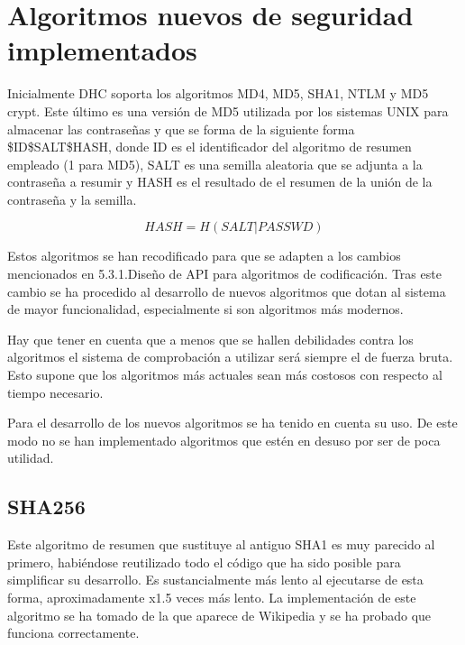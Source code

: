 \section{Algoritmos nuevos de seguridad implementados}

Inicialmente DHC soporta los algoritmos MD4, MD5, SHA1, NTLM y MD5 crypt. Este último es una versión de MD5 utilizada por los sistemas UNIX para almacenar las contraseñas y que se forma de la siguiente forma \$ID\$SALT\$HASH, donde ID es el identificador del algoritmo de resumen empleado (1 para MD5), SALT es una semilla aleatoria que se adjunta a la contraseña a resumir y HASH es el resultado de el resumen de la unión de la contraseña y la semilla.

$$HASH = H(SALT | PASSWD)$$

Estos algoritmos se han recodificado para que se adapten a los cambios mencionados en 5.3.1.Diseño de API para algoritmos de codificación. Tras este cambio se ha procedido al desarrollo de nuevos algoritmos que dotan al sistema de mayor funcionalidad, especialmente si son algoritmos más modernos.

Hay que tener en cuenta que a menos que se hallen debilidades contra los algoritmos el sistema de comprobación a utilizar será siempre el de fuerza bruta. Esto supone que los algoritmos más actuales sean más costosos con respecto al tiempo necesario.

Para el desarrollo de los nuevos algoritmos se ha tenido en cuenta su uso. De este modo no se han implementado algoritmos que estén en desuso por ser de poca utilidad.

\subsection{SHA256}

Este algoritmo de resumen que sustituye al antiguo SHA1 es muy parecido al primero, habiéndose reutilizado todo el código que ha sido posible para simplificar su desarrollo. Es sustancialmente más lento al ejecutarse de esta forma, aproximadamente x1.5 veces más lento.
La implementación de este algoritmo se ha tomado de la que aparece de Wikipedia y se ha probado que funciona correctamente.
